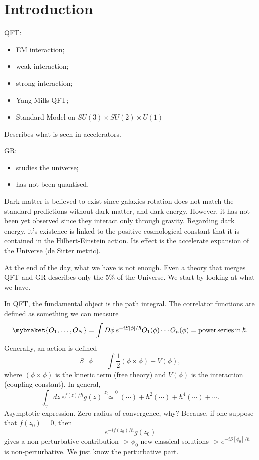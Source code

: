 \chapter{Introduction}
QFT:
\begin{itemize}
    \item EM interaction;
    \item weak interaction;
    \item strong interaction;
    \item Yang-Mills QFT;
    \item Standard Model on $SU(3) \times SU(2) \times U(1)$
\end{itemize}
Describes what is seen in accelerators.

GR:
\begin{itemize}
    \item studies the universe;
    \item has not been quantised.
\end{itemize}

Dark matter is believed to exist since galaxies rotation does not match the standard predictions without dark matter, and dark energy. However, it has not been yet observed since they interact only through gravity. Regarding dark energy, it's existence is linked to the positive cosmological constant that it is contained in the Hilbert-Einstein action. Its effect is the accelerate expansion of the Universe (de Sitter metric). 

At the end of the day, what we have is not enough. Even a theory that merges QFT and GR describes only the 5\% of the Universe. We start by looking at what we have.

In QFT, the fundamental object is the path integral. The correlator functions are defined as something we can measure 
\begin{equation}
    \mybraket{O_1,\dots,O_N} = \int D\phi\,e^{-iS[\phi]/\hbar}O_1(\phi)\cdots O_n(\phi) = \mathrm{power\,series\,in\,\hbar}.
\end{equation}
Generally, an action is defined
\begin{equation}
    S[\phi] = \int \frac{1}{2}(\phi \times \phi) + V(\phi),
\end{equation}
where $(\phi \times \phi)$ is the kinetic term (free theory) and $V(\phi)$ is the interaction (coupling constant). In general,
\begin{equation}
    \int_\gamma dz\,e^{f(z)/\hbar}g(z) \overset{z_0 = 0}{\simeq} (\cdots) + \hbar^2(\cdots) + \hbar^4(\cdots) + \cdots.
\end{equation}
Asymptotic expression. Zero radius of convergence, why? Because, if one suppose that $f(z_0) = 0$, then 
\begin{equation}
    e^{-if(z_0)/\hbar}g(z_0)
\end{equation}
gives a non-perturbative contribution -> $\phi_0$ new classical solutions -> $e^{-iS[\phi_0]/\hbar}$ is non-perturbative. We just know the perturbative part. 

